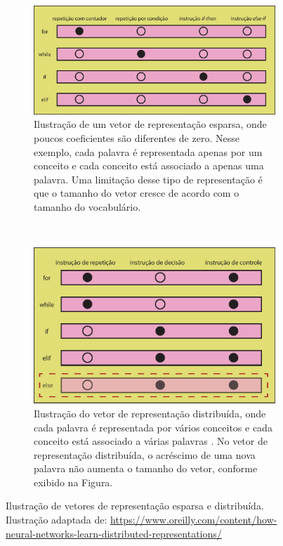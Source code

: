 \begin{figure}[H]
\centering
\begin{subfigure}{.7\textwidth}
  \centering
  \includegraphics[width=1\linewidth]{figuras/cap-trabalhos-relacionados/discrete-representation.pdf}
  \caption{Ilustração de um vetor de representação esparsa, onde poucos coeficientes são diferentes de zero. Nesse exemplo, cada palavra é representada apenas por um conceito e cada conceito está associado a apenas uma palavra. Uma limitação desse tipo de representação é que o tamanho do vetor cresce de acordo com o tamanho do vocabulário.}
  \label{fig:discrete-representation}
\end{subfigure}%
\\
\begin{subfigure}{.7\textwidth}
  \centering
  \includegraphics[width=1\linewidth]{figuras/cap-trabalhos-relacionados/distributed-representation.pdf}
  \caption{Ilustração do vetor de representação distribuída, onde cada palavra é representada por vários conceitos e cada conceito está associado a várias palavras \citep{Hinton-distributed-representatons:1986}. No vetor de representação distribuída, o acréscimo de uma nova palavra não aumenta o tamanho do vetor, conforme exibido na Figura.}
  \label{fig:distributed-representation}
\end{subfigure}

\caption{Ilustração de vetores de representação esparsa e distribuída. Ilustração adaptada de: \url{https://www.oreilly.com/content/how-neural-networks-learn-distributed-representations/}}
\label{fig:discrete-vs-distributed-representation}
\end{figure}

